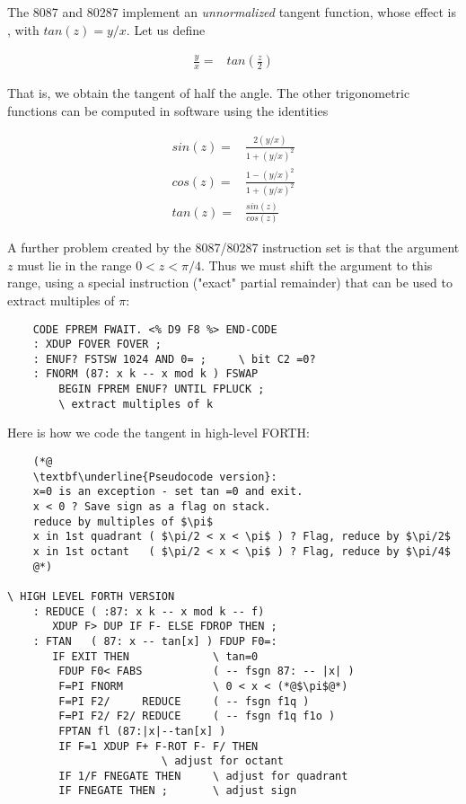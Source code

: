 The 8087 and 80287 implement an \textit{unnormalized} tangent function, whose effect is , with $tan(z)=y/x$. Let us define

\begin{align} 
    \frac{y}{x} =& tan(\frac{z}{2})
\end{align}

That is, we obtain the tangent of half the angle. The other trigonometric functions can be computed in software using the identities

\begin{align}
    sin(z) =& \frac{2(y/x)}{1 + (y/x)^{2}}       \\
    cos(z) =& \frac{1 - (y/x)^2}{1 + (y/x)^2}   \\
    tan(z) =& \frac{sin(z)}{cos(z)}
\end{align}

A further problem created by the 8087/80287 instruction set is that the argument $z$ must lie in the range $0 < z < \pi/4$. Thus we must shift the argument to this range, using a special instruction  ("exact" partial remainder) that can be used to extract multiples of $\pi$:

\begin{lstlisting}
    CODE FPREM FWAIT. <% D9 F8 %> END-CODE
    : XDUP FOVER FOVER ;
    : ENUF? FSTSW 1024 AND 0= ;     \ bit C2 =0?
    : FNORM (87: x k -- x mod k ) FSWAP
        BEGIN FPREM ENUF? UNTIL FPLUCK ;
        \ extract multiples of k
\end{lstlisting}

Here is how we code the tangent in high-level FORTH:

\begin{lstlisting}
    (*@
    \textbf\underline{Pseudocode version}:
    x=0 is an exception - set tan =0 and exit.
    x < 0 ? Save sign as a flag on stack.
    reduce by multiples of $\pi$
    x in 1st quadrant ( $\pi/2 < x < \pi$ ) ? Flag, reduce by $\pi/2$
    x in 1st octant   ( $\pi/2 < x < \pi$ ) ? Flag, reduce by $\pi/4$
    @*)

\ HIGH LEVEL FORTH VERSION
    : REDUCE ( :87: x k -- x mod k -- f)
       XDUP F> DUP IF F- ELSE FDROP THEN ;
    : FTAN   ( 87: x -- tan[x] ) FDUP F0=:
       IF EXIT THEN             \ tan=0
        FDUP F0< FABS           ( -- fsgn 87: -- |x| )
        F=PI FNORM              \ 0 < x < (*@$\pi$@*)
        F=PI F2/     REDUCE     ( -- fsgn f1q )
        F=PI F2/ F2/ REDUCE     ( -- fsgn f1q f1o )
        FPTAN fl (87:|x|--tan[x] )
        IF F=1 XDUP F+ F-ROT F- F/ THEN
                        \ adjust for octant
        IF 1/F FNEGATE THEN     \ adjust for quadrant
        IF FNEGATE THEN ;       \ adjust sign
\end{lstlisting}

